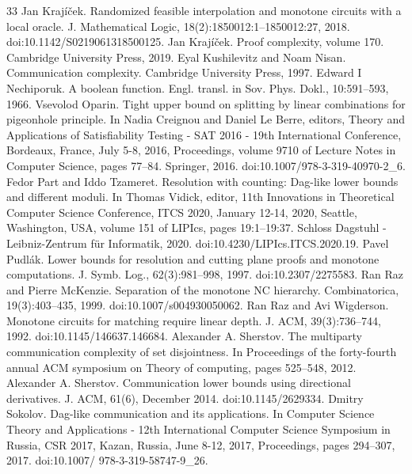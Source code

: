 \documentclass[10pt,a4paper]{article}
\begin{document}
\begin{thebibliography}{33}
 Jan Krajíček. Randomized feasible interpolation and monotone circuits with a local oracle. J. Mathematical Logic, 18(2):1850012:1–1850012:27, 2018. doi:10.1142/S0219061318500125.
 Jan Krajíček. Proof complexity, volume 170. Cambridge University Press, 2019.
 Eyal Kushilevitz and Noam Nisan. Communication complexity. Cambridge University Press, 1997.
 Edward I Nechiporuk. A boolean function. Engl. transl. in Sov. Phys. Dokl., 10:591–593, 1966.
 Vsevolod Oparin. Tight upper bound on splitting by linear combinations for pigeonhole principle. In Nadia Creignou and Daniel Le Berre, editors, Theory and Applications of Satisfiability Testing - SAT 2016 - 19th International Conference, Bordeaux, France, July 5-8, 2016, Proceedings, volume 9710 of Lecture Notes in Computer Science, pages 77–84. Springer, 2016. doi:10.1007/978-3-319-40970-2\_6.
 Fedor Part and Iddo Tzameret. Resolution with counting: Dag-like lower bounds and different moduli. In Thomas Vidick, editor, 11th Innovations in Theoretical Computer Science Conference, ITCS 2020, January 12-14, 2020, Seattle, Washington, USA, volume 151 of LIPIcs, pages 19:1–19:37. Schloss Dagstuhl - Leibniz-Zentrum für Informatik, 2020. doi:10.4230/LIPIcs.ITCS.2020.19.
 Pavel Pudlák. Lower bounds for resolution and cutting plane proofs and monotone computations. J. Symb. Log., 62(3):981–998, 1997. doi:10.2307/2275583.
 Ran Raz and Pierre McKenzie. Separation of the monotone NC hierarchy. Combinatorica, 19(3):403–435, 1999. doi:10.1007/s004930050062.
 Ran Raz and Avi Wigderson. Monotone circuits for matching require linear depth. J. ACM, 39(3):736–744, 1992. doi:10.1145/146637.146684.
 Alexander A. Sherstov. The multiparty communication complexity of set disjointness. In Proceedings of the forty-fourth annual ACM symposium on Theory of computing, pages 525–548, 2012.
 Alexander A. Sherstov. Communication lower bounds using directional derivatives. J. ACM, 61(6), December 2014. doi:10.1145/2629334.
 Dmitry Sokolov. Dag-like communication and its applications. In Computer Science Theory and Applications - 12th International Computer Science Symposium in Russia, CSR 2017, Kazan, Russia, June 8-12, 2017, Proceedings, pages 294–307, 2017. doi:10.1007/ 978-3-319-58747-9\_26.
\end{thebibliography}
\end{document}

